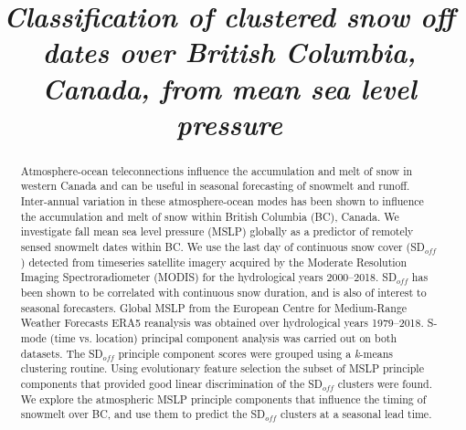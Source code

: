 \documentclass{tATO2e}
\newcommand{\sdoff}{SD$_{off}$}
\begin{document}

\articletype{}%

\title{\textit{Classification of clustered snow off dates over British Columbia, Canada, from mean sea level pressure}}

\author{
}

\maketitle

\begin{abstract}
Atmosphere-ocean teleconnections influence the accumulation and melt of snow in western Canada and can be useful in seasonal forecasting of snowmelt and runoff. Inter-annual variation in these atmosphere-ocean modes has been shown to influence the accumulation and melt of snow within British Columbia (BC), Canada. We investigate fall mean sea level pressure (MSLP) globally as a predictor of remotely sensed snowmelt dates within BC. We use the last day of continuous snow cover (\sdoff{}) detected from timeseries satellite imagery acquired by the Moderate Resolution Imaging Spectroradiometer (MODIS) for the hydrological years 2000--2018. \sdoff{} has been shown to be correlated with continuous snow duration, and is also of interest to seasonal forecasters. Global MSLP from the European Centre for Medium-Range Weather Forecasts ERA5 reanalysis was obtained over hydrological years 1979--2018. S-mode (time vs. location) principal component analysis was carried out on both datasets. The \sdoff{} principle component scores were grouped using a \textit{k}-means clustering routine. Using evolutionary feature selection the subset of MSLP principle components that provided good linear discrimination of the \sdoff{} clusters were found. We explore the atmospheric MSLP principle components that influence the timing of snowmelt over BC, and use them to predict the \sdoff{} clusters at a seasonal lead time. 
\end{abstract}
\end{document}
